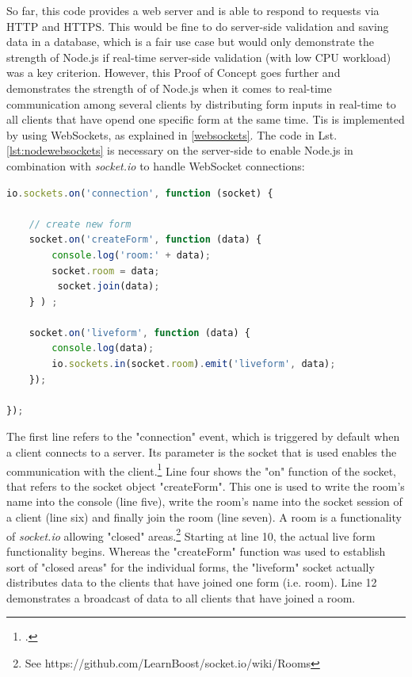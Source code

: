 So far, this code provides a web server and is able to respond to requests via HTTP and HTTPS. This would be fine to do server-side validation and saving data in a database, which is a fair use case but would only demonstrate the strength of Node.js if real-time server-side validation (with low CPU workload) was a key criterion. However, this Proof of Concept goes further and demonstrates the strength of of Node.js when it comes to real-time communication among several clients by distributing form inputs in real-time to all clients that have opend one specific form at the same time. Tis is implemented by using WebSockets, as explained in \ref{websockets}. The code in Lst.  \ref{lst:nodewebsockets} is necessary on the server-side to enable Node.js in combination with \textit{socket.io} to handle WebSocket connections:

\begin{lstlisting}[language=javascript,caption={Using WebSockets to distribute form inputs in real-time},label=lst:nodewebsockets]
io.sockets.on('connection', function (socket) {

    // create new form
    socket.on('createForm', function (data) {
        console.log('room:' + data);
        socket.room = data;
         socket.join(data);
    } ) ;

    socket.on('liveform', function (data) {
        console.log(data);
        io.sockets.in(socket.room).emit('liveform', data);
    });

});
\end{lstlisting}

The first line refers to the "connection" event, which is triggered by default when a client connects to a server. Its parameter is the socket that is used enables the communication with the client.\footcite[Cf.][197]{Roden_2012} Line four shows the "on" function of the socket, that refers to the socket object "createForm". This one is used to write the room's name into the console (line five), write the room's name into the socket session of a client (line six) and finally join the room (line seven). A room is a functionality of \textit{socket.io} allowing "closed" areas.\footnote{See https://github.com/LearnBoost/socket.io/wiki/Rooms} Starting at line 10, the actual live form functionality begins. Whereas the "createForm" function was used to establish sort of "closed areas" for the individual forms, the "liveform" socket actually distributes data to the clients that have joined one form (i.e. room). Line 12 demonstrates a broadcast of data to all clients that have joined a room.

